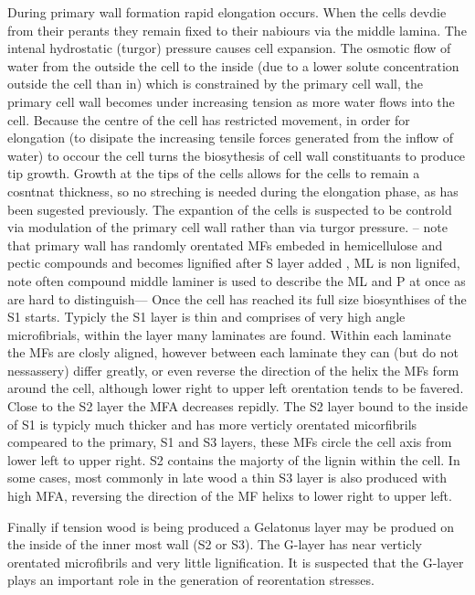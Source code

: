 \documentclass{article}
\begin{document}
During primary wall formation rapid elongation occurs. When the cells devdie
from their perants they remain fixed to their nabiours via the middle lamina.
The intenal hydrostatic (turgor) pressure causes cell expansion. The osmotic flow of
water from the outside the cell to the inside (due to a lower solute concentration
outside the cell than in) which is constrained by the primary cell wall, the
primary cell wall becomes under increasing tension as more water flows into
the cell. Because the centre of the cell has restricted movement, in order for
elongation (to disipate the increasing tensile forces generated from the
inflow of water) to occour the cell turns the biosythesis of cell wall
constituants to produce tip growth. Growth at the tips of the cells allows for
the cells to remain a cosntnat thickness, so no streching is needed during the
elongation phase, as has been sugested previously. The expantion of the cells is
suspected to be controld via modulation of the primary cell wall rather than via
turgor pressure. -- note that primary wall has randomly orentated MFs embeded
in hemicellulose and pectic compounds and becomes lignified after S layer added
, ML is non lignifed, note often compound middle laminer is used to describe
the ML and P at once as are hard to distinguish--- Once the cell has reached its
full size biosynthises of the S1 starts.
Typicly the S1 layer is thin and comprises of very high angle microfibrials,
within the layer many laminates are found. Within each laminate the MFs are
closly aligned, however between each laminate they can (but do not nessassery)
differ greatly, or even reverse the direction of the helix the MFs form around
the cell, although lower right to upper left orentation tends to be favered.
Close to the S2 layer the MFA decreases repidly.
The S2 layer bound to the inside of S1 is typicly much thicker and has more
verticly orentated micorfibrils compeared to the primary, S1 and S3 layers, these MFs circle the
cell axis from lower left to upper right. S2 contains the majorty of the lignin
within the cell. In some cases, most commonly in late wood a thin S3 layer is
also produced with high MFA, reversing the direction of the MF helixs to lower
right to upper left.

Finally if tension wood is being produced a Gelatonus layer
may be produed on the inside of the inner most wall (S2 or S3). The G-layer has
near verticly orentated microfibrils and very little lignification. It is suspected that the
G-layer plays an important role in the generation of reorentation stresses.
\end{document}
